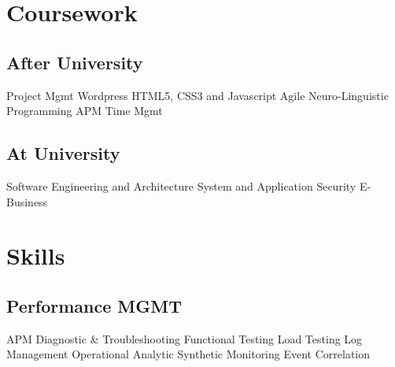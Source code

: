 \documentclass[letterpaper]{deedy-resume} %
\begin{document}
\begin{minipage}[t]{0.33\textwidth}

\section{Coursework}

\subsection{After University}

Project Mgmt \textbullet{} 
Wordpress \textbullet{} 
HTML5, CSS3 and Javascript \textbullet{} 
Agile \textbullet{} 
Neuro-Linguistic Programming \textbullet{}
APM \textbullet{}
Time Mgmt

\sectionspace %


\subsection{At University}

Software Engineering and Architecture \textbullet{} 
System and Application Security \textbullet{} 
E-Business

\sectionspace %


\section{Skills}

\subsection{Performance MGMT}

%
%

APM \textbullet{}
Diagnostic \& Troubleshooting \textbullet{}
Functional Testing \textbullet{}
Load Testing \textbullet{}
Log Management \textbullet{}
Operational Analytic \textbullet{}
Synthetic Monitoring \textbullet{}
Event Correlation


\end{minipage}
\end{document}
